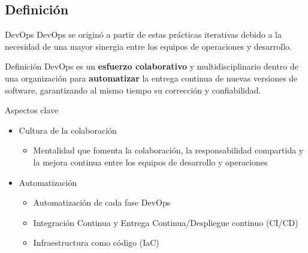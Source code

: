 \documentclass{beamer}
\begin{document}
\subsection{Definición}

\begin{frame}{DevOps}
DevOps se originó a partir de estas prácticas iterativas debido a la necesidad de una mayor sinergia entre los equipos de operaciones y desarrollo.

\begin{block}{Definición}
DevOps es un \textbf{esfuerzo colaborativo} y multidisciplinario dentro de una organización para \textbf{automatizar} la entrega continua de nuevas versiones de software, garantizando al mismo tiempo su corrección y confiabilidad.%
\end{block}

    
\end{frame}

\begin{frame}{Aspectos clave}

\begin{itemize}
    \item Cultura de la colaboración
    

    \begin{itemize}
        \item Mentalidad que fomenta la colaboración, la responsabilidad compartida y la mejora continua entre los equipos de desarrollo y operaciones

    \end{itemize}
    
    \item Automatización
    
    \begin{itemize}

        \item Automatización de cada fase DevOps
        \item Integración Continua y Entrega Continua/Despliegue continuo (CI/CD)

        \item Infraestructura como código (IaC)
    \end{itemize}
    
    
\end{itemize}
    
\end{frame}
\end{document}
